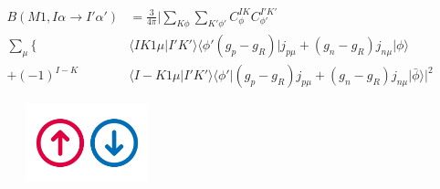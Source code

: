 \documentclass{article}
\begin{document}
\begin{equation*}
    \begin{aligned}
        B(M1, I\alpha \rightarrow I'\alpha')
                      & = \frac{3}{4\pi} \big| \sum_{K\phi} \sum_{K'\phi'} C_{\phi}^{IK} C_{\phi'}^{I'K'}                                             \\
        \sum_{\mu} \{ & \langle IK1\mu \big| I'K' \rangle \langle \phi' (g_p-g_R)\big| j_{p\mu} + (g_n-g_R)j_{n\mu} \big| \phi \rangle                \\
        + (-1)^{I-K}  & \langle I-K1\mu \big| I'K' \rangle \langle \phi' \big| (g_p-g_R)j_{p\mu} + (g_n-g_R)j_{n\mu} \big| \bar{\phi} \rangle \big|^2
    \end{aligned}
\end{equation*}


\begin{figure}[htpb]
    \centering
    \includegraphics*[width=100pt]{arrow.jpg}
\end{figure}
\end{document}
